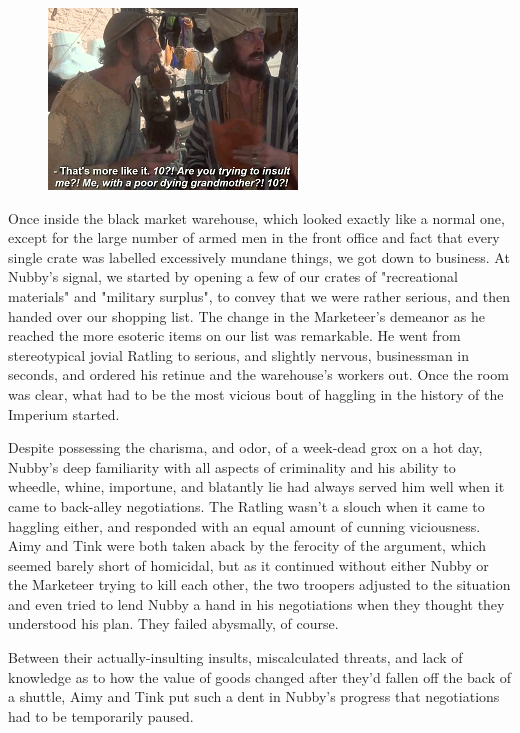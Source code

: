 \begin{figure}
	\begin{center}
		\includegraphics[width=\figwidth]{pics/14/19.png}
	\end{center}
\end{figure}
Once inside the black market warehouse, which looked exactly like a normal one, except for the large number of armed men in the front office and fact that every single crate was labelled excessively mundane things, we got down to business. 
At Nubby's signal, we started by opening a few of our crates of "recreational materials" and "military surplus", to convey that we were rather serious, and then handed over our shopping list. 
The change in the Marketeer's demeanor as he reached the more esoteric items on our list was remarkable. 
He went from stereotypical jovial Ratling to serious, and slightly nervous, businessman in seconds, and ordered his retinue and the warehouse's workers out. 
Once the room was clear, what had to be the most vicious bout of haggling in the history of the Imperium started.

Despite possessing the charisma, and odor, of a week-dead grox on a hot day, Nubby's deep familiarity with all aspects of criminality and his ability to wheedle, whine, importune, and blatantly lie had always served him well when it came to back-alley negotiations. 
The Ratling wasn't a slouch when it came to haggling either, and responded with an equal amount of cunning viciousness. 
Aimy and Tink were both taken aback by the ferocity of the argument, which seemed barely short of homicidal, but as it continued without either Nubby or the Marketeer trying to kill each other, the two troopers adjusted to the situation and even tried to lend Nubby a hand in his negotiations when they thought they understood his plan. 
They failed abysmally, of course.

Between their actually-insulting insults, miscalculated threats, and lack of knowledge as to how the value of goods changed after they'd fallen off the back of a shuttle, Aimy and Tink put such a dent in Nubby's progress that negotiations had to be temporarily paused. 



